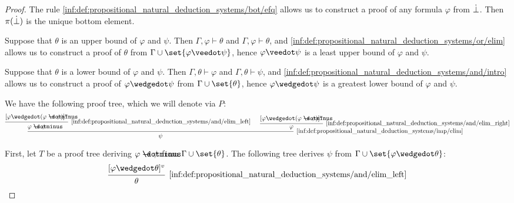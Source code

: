 \begin{proof}
   The rule \ref{inf:def:propositional_natural_deduction_systems/bot/efq} allows us to construct a proof of any formula \( \varphi \) from \( \dot{\bot} \). Then \( \pi(\dot{\bot}) \) is the unique bottom element.

   Suppose that \( \theta \) is an upper bound of \( \varphi \) and \( \psi \). Then \( \Gamma, \varphi \vdash \theta \) and \( \Gamma, \varphi \vdash \theta \), and \ref{inf:def:propositional_natural_deduction_systems/or/elim} allows us to construct a proof of \( \theta \) from \( \Gamma \cup \set{ \varphi \synvee \psi } \), hence \( \varphi \synvee \psi \) is a least upper bound of \( \varphi \) and \( \psi \).

   Suppose that \( \theta \) is a lower bound of \( \varphi \) and \( \psi \). Then \( \Gamma, \theta \vdash \varphi \) and \( \Gamma, \theta \vdash \psi \), and \ref{inf:def:propositional_natural_deduction_systems/and/intro} allows us to construct a proof of \( \varphi \synwedge \psi \) from \( \Gamma \cup \set{ \theta } \), hence \( \varphi \synwedge \psi \) is a greatest lower bound of \( \varphi \) and \( \psi \).



  We have the following proof tree, which we will denote via \( P \):
  \begin{equation*}
    \begin{prooftree}
      \hypo{ [\varphi \synwedge (\varphi \synimplies \psi)]^u }
      \infer1[\ref{inf:def:propositional_natural_deduction_systems/and/elim_left}]{ \varphi \synimplies \psi }

      \hypo{ [\varphi \synwedge (\varphi \synimplies \psi)]^u }
      \infer1[\ref{inf:def:propositional_natural_deduction_systems/and/elim_right}]{ \varphi }

      \infer2[\ref{inf:def:propositional_natural_deduction_systems/imp/elim}]{ \psi }
    \end{prooftree}
  \end{equation*}


  First, let \( T \) be a proof tree deriving \( \varphi \synimplies \psi \) from \( \Gamma \cup \set{ \theta } \). The following tree derives \( \psi \) from \( \Gamma \cup \set{ \varphi \synwedge \theta } \):
  \begin{equation*}
    \begin{prooftree}
      \hypo{ [\varphi \synwedge \theta]^v }
      \infer1[\ref{inf:def:propositional_natural_deduction_systems/and/elim_left}]{ \theta }


\end{prooftree}
\end{equation*}
\end{proof}
